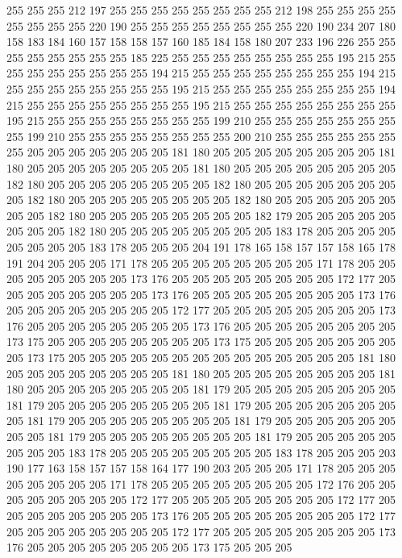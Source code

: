 255 255 255 212 197 255 255 255 255 255 255 255 255 212 198 255 255 255 255 255
255 255 255 220 190 255 255 255 255 255 255 255 255 220 190 234 207 180 158 183
184 160 157 158 158 157 160 185 184 158 180 207 233 196 226 255 255 255 255 255
255 255 255 185 225 255 255 255 255 255 255 255 255 195 215 255 255 255 255 255
255 255 255 194 215 255 255 255 255 255 255 255 255 194 215 255 255 255 255 255
255 255 255 195 215 255 255 255 255 255 255 255 255 194 215 255 255 255 255 255
255 255 255 195 215 255 255 255 255 255 255 255 255 195 215 255 255 255 255 255
255 255 255 199 210 255 255 255 255 255 255 255 255 199 210 255 255 255 255 255
255 255 255 200 210 255 255 255 255 255 255 255 205 205 205 205 205 205 205 181
180 205 205 205 205 205 205 205 205 181 180 205 205 205 205 205 205 205 205 181
180 205 205 205 205 205 205 205 205 182 180 205 205 205 205 205 205 205 205 182
180 205 205 205 205 205 205 205 205 182 180 205 205 205 205 205 205 205 205 182
180 205 205 205 205 205 205 205 205 182 180 205 205 205 205 205 205 205 205 182
179 205 205 205 205 205 205 205 205 182 180 205 205 205 205 205 205 205 205 183
178 205 205 205 205 205 205 205 205 183 178 205 205 205 204 191 178 165 158 157
157 158 165 178 191 204 205 205 205 171 178 205 205 205 205 205 205 205 205 171
178 205 205 205 205 205 205 205 205 173 176 205 205 205 205 205 205 205 205 172
177 205 205 205 205 205 205 205 205 173 176 205 205 205 205 205 205 205 205 173
176 205 205 205 205 205 205 205 205 172 177 205 205 205 205 205 205 205 205 173
176 205 205 205 205 205 205 205 205 173 176 205 205 205 205 205 205 205 205 173
175 205 205 205 205 205 205 205 205 173 175 205 205 205 205 205 205 205 205 173
175 205 205 205 205 205 205 205 205 205 205 205 205 205 205 181 180 205 205 205
205 205 205 205 205 181 180 205 205 205 205 205 205 205 205 181 180 205 205 205
205 205 205 205 205 181 179 205 205 205 205 205 205 205 205 181 179 205 205 205
205 205 205 205 205 181 179 205 205 205 205 205 205 205 205 181 179 205 205 205
205 205 205 205 205 181 179 205 205 205 205 205 205 205 205 181 179 205 205 205
205 205 205 205 205 181 179 205 205 205 205 205 205 205 205 183 178 205 205 205
205 205 205 205 205 183 178 205 205 205 203 190 177 163 158 157 157 158 164 177
190 203 205 205 205 171 178 205 205 205 205 205 205 205 205 171 178 205 205 205
205 205 205 205 205 172 176 205 205 205 205 205 205 205 205 172 177 205 205 205
205 205 205 205 205 172 177 205 205 205 205 205 205 205 205 173 176 205 205 205
205 205 205 205 205 172 177 205 205 205 205 205 205 205 205 172 177 205 205 205
205 205 205 205 205 173 176 205 205 205 205 205 205 205 205 173 175 205 205 205
